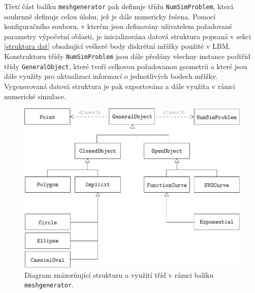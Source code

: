 Třetí část balíku \texttt{meshgenerator} pak definuje třídu \texttt{NumSimProblem}, která souhrnně definuje celou úlohu, jež je dále numericky řešena. Pomocí konfiguračního souboru, v kterém jsou definovány uživatelem požadované parametry výpočetní oblasti, je inicializována datová struktura popsaná v sekci \ref{struktura dat} obsahující veškeré body diskrétní mřížky použité v LBM. Konstruktoru třídy \texttt{NumSimProblem} jsou dále předány všechny instance podtříd třídy \texttt{GeneralObject}, které tvoří celkovou požadovanou geometrii a které jsou dále využity pro aktualizaci informací o jednotlivých bodech mřížky. Vygenerovaná datová struktura je pak exportována a dále využita v rámci numerické simulace.

\begin{figure}[h]
	\centering
	\vspace{8mm}
	\includegraphics[width=0.9	\textwidth]{Images/umldiagram.pdf}
	\vspace{2mm}
	\caption{Diagram znázorňující strukturu a využití tříd v rámci balíku \texttt{meshgenerator}.}
	\label{fig:uml meshgenerator}
	\vspace{1.8mm}
\end{figure}